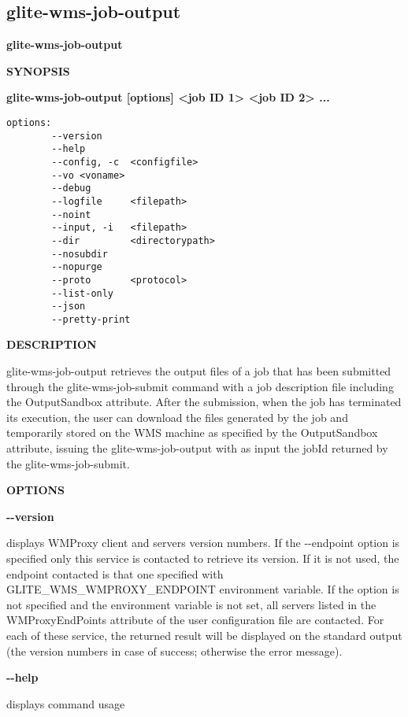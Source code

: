 
\subsection{glite-wms-job-output}
\label{glite-wms-job-output}

\medskip
\textbf{glite-wms-job-output}
\smallskip


\textbf{SYNOPSIS}
\smallskip

\textbf{glite-wms-job-output [options]  <job ID 1> <job ID 2> ...}

\begin{verbatim}
options:
        --version
        --help
        --config, -c  <configfile>
        --vo <voname>
        --debug
        --logfile     <filepath>
        --noint
        --input, -i   <filepath>
        --dir         <directorypath>
        --nosubdir
        --nopurge
        --proto       <protocol>
        --list-only
        --json
        --pretty-print
\end{verbatim}

\medskip
\textbf{DESCRIPTION}
\smallskip

glite-wms-job-output retrieves the output files of a job that has been submitted through the glite-wms-job-submit 
command with a job description file including the OutputSandbox attribute.
After the submission, when the job has terminated its execution, the user can download the files generated 
by the job and temporarily stored on the WMS machine as specified by the OutputSandbox attribute, 
issuing the glite-wms-job-output with as input the jobId returned by the glite-wms-job-submit.


\medskip\textbf{OPTIONS}\smallskip



\textbf{-{}-version}

displays WMProxy client and servers version numbers.
If the -{}-endpoint option is specified only this service is contacted to retrieve its version. If it is not used, the endpoint contacted is that one specified with GLITE\_WMS\_WMPROXY\_ENDPOINT environment variable. If the option is not specified and the environment variable is not set, all servers listed in the WMProxyEndPoints attribute of the user configuration file are contacted. For each of these service, the returned result will be displayed on the standard output (the version numbers in case of success; otherwise the error message).




\textbf{-{}-help}

displays command usage




